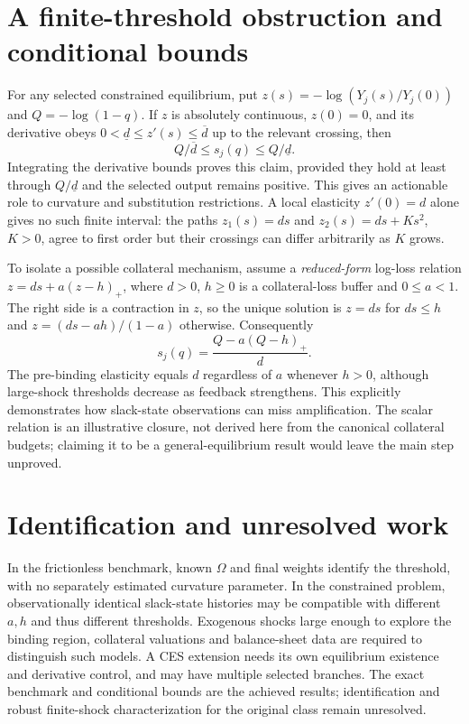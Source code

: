 \documentclass[11pt]{article}
\begin{document}
\section{A finite-threshold obstruction and conditional bounds}
For any selected constrained equilibrium, put $z(s)=-\log(Y_j(s)/Y_j(0))$ and $Q=-\log(1-q)$. If $z$ is absolutely continuous, $z(0)=0$, and its derivative obeys $0<\underline d\leq z'(s)\leq\overline d$ up to the relevant crossing, then
\[
 Q/\overline d\leq s_j(q)\leq Q/\underline d.
\]
Integrating the derivative bounds proves this claim, provided they hold at least through $Q/\underline d$ and the selected output remains positive. This gives an actionable role to curvature and substitution restrictions. A local elasticity $z'(0)=d$ alone gives no such finite interval: the paths $z_1(s)=ds$ and $z_2(s)=ds+Ks^2$, $K>0$, agree to first order but their crossings can differ arbitrarily as $K$ grows.

To isolate a possible collateral mechanism, assume a \emph{reduced-form} log-loss relation $z=ds+a(z-h)_+$, where $d>0$, $h\geq0$ is a collateral-loss buffer and $0\leq a<1$. The right side is a contraction in $z$, so the unique solution is $z=ds$ for $ds\leq h$ and $z=(ds-ah)/(1-a)$ otherwise. Consequently
\[
 s_j(q)=\frac{Q-a(Q-h)_+}{d}.
\]
The pre-binding elasticity equals $d$ regardless of $a$ whenever $h>0$, although large-shock thresholds decrease as feedback strengthens. This explicitly demonstrates how slack-state observations can miss amplification. The scalar relation is an illustrative closure, not derived here from the canonical collateral budgets; claiming it to be a general-equilibrium result would leave the main step unproved.

\section{Identification and unresolved work}
In the frictionless benchmark, known $\Omega$ and final weights identify the threshold, with no separately estimated curvature parameter. In the constrained problem, observationally identical slack-state histories may be compatible with different $a,h$ and thus different thresholds. Exogenous shocks large enough to explore the binding region, collateral valuations and balance-sheet data are required to distinguish such models. A CES extension needs its own equilibrium existence and derivative control, and may have multiple selected branches. The exact benchmark and conditional bounds are the achieved results; identification and robust finite-shock characterization for the original class remain unresolved.
\end{document}
